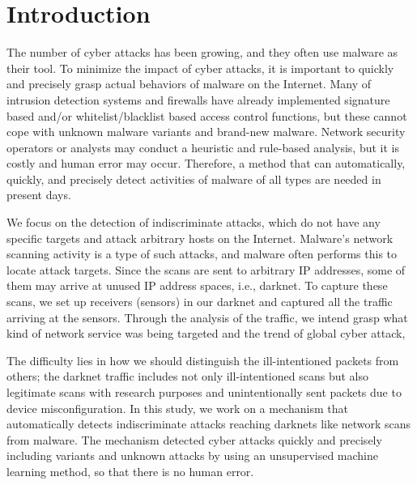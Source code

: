\documentclass[conference]{IEEEtran}
\begin{document}
\section{Introduction}

The number of cyber attacks has been growing, and they often use malware as their tool.
To minimize the impact of cyber attacks, it is important to quickly and precisely grasp actual behaviors of malware on the Internet.
Many of intrusion detection systems and firewalls have already implemented signature based and/or whitelist/blacklist based access control functions, but these cannot cope with unknown malware variants and brand-new malware.
Network security operators or analysts may conduct a heuristic and rule-based analysis, but it is costly and human error may occur.
Therefore, a method that can automatically, quickly, and precisely detect activities of malware of all types are needed in present days.

We focus on the detection of indiscriminate attacks, which do not have any specific targets and attack arbitrary hosts on the Internet.
Malware's network scanning activity is a type of such attacks, and malware often performs this to locate attack targets.
Since the scans are sent to arbitrary IP addresses, some of them may arrive at unused IP address spaces, i.e., darknet.
To capture these scans, we set up receivers (sensors) in our darknet and captured all the traffic arriving at the sensors.
Through the analysis of the traffic, we intend grasp what kind of network service was being targeted and the trend of global cyber attack,

The difficulty lies in how we should distinguish the ill-intentioned packets from others; the darknet traffic includes not only ill-intentioned scans but also legitimate scans with research purposes and unintentionally sent packets due to device misconfiguration.
In this study, we work on a mechanism that automatically detects indiscriminate attacks reaching darknets like network scans from malware.
The mechanism detected cyber attacks quickly and precisely including variants and unknown attacks by using an unsupervised machine learning method, so that there is no human error.
\end{document}
